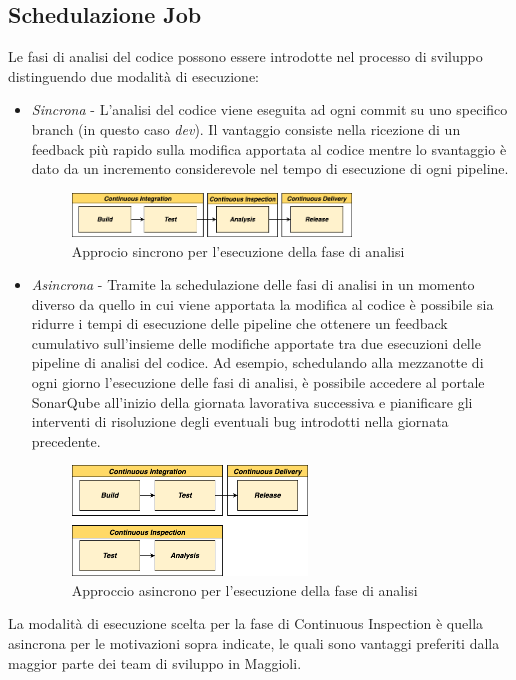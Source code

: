 \subsection{Schedulazione Job}
Le fasi di analisi del codice possono essere introdotte nel processo di sviluppo distinguendo due modalità di esecuzione:
\begin{itemize}
    \item \textit{Sincrona} - L'analisi del codice viene eseguita ad ogni commit su uno specifico branch (in questo caso \textit{dev}). Il vantaggio consiste nella ricezione di un feedback più rapido sulla modifica apportata al codice mentre lo svantaggio è dato da un incremento considerevole nel tempo di esecuzione di ogni pipeline.
    \begin{figure}[H]
    \centering
    \includegraphics[width=0.7\textwidth]{img/tesi-2-30.cicdci.drawio.png}
    \caption{Approcio sincrono per l'esecuzione della fase di analisi}
    \end{figure}
    \item \textit{Asincrona} - Tramite la schedulazione delle fasi di analisi in un momento diverso da quello in cui viene apportata la modifica al codice è possibile sia ridurre i tempi di esecuzione delle pipeline che ottenere un feedback cumulativo sull'insieme delle modifiche apportate tra due esecuzioni delle pipeline di analisi del codice. Ad esempio, schedulando alla mezzanotte di ogni giorno l'esecuzione delle fasi di analisi, è possibile accedere al portale SonarQube all'inizio della giornata lavorativa successiva e pianificare gli interventi di risoluzione degli eventuali bug introdotti nella giornata precedente.
    \begin{figure}[H]
    \centering
    \includegraphics[width=0.59\textwidth]{img/tesi-2-31-cicdci2.drawio.png}
    \caption{Approccio asincrono per l'esecuzione della fase di analisi}
    \end{figure}
\end{itemize}
La modalità di esecuzione scelta per la fase di Continuous Inspection è quella asincrona per le motivazioni sopra indicate, le quali sono vantaggi preferiti dalla maggior parte dei team di sviluppo in Maggioli.

